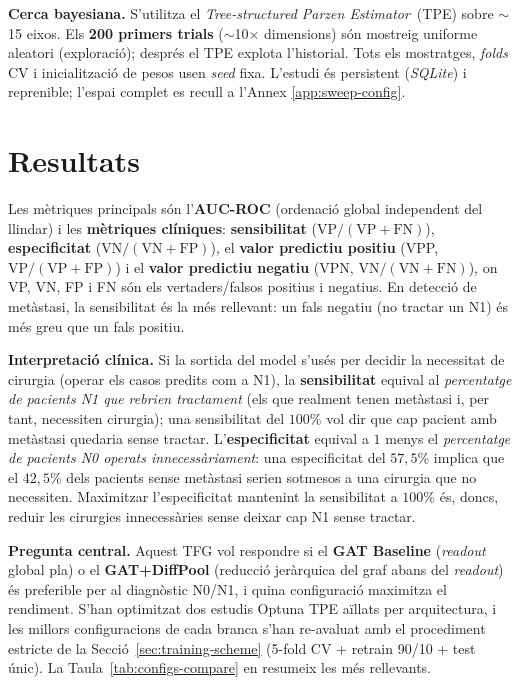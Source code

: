 \documentclass[10pt,a4paper,twocolumn,twoside]{article}
\begin{document}
\textbf{Cerca bayesiana.} S'utilitza el \textit{Tree-structured Parzen Estimator}~(TPE) sobre
$\sim$15 eixos. Els \textbf{200 primers trials} ($\sim$10$\times$ dimensions) són mostreig uniforme
aleatori (exploració); després el TPE explota l'historial. Tots els mostratges, \textit{folds} CV i
inicialització de pesos usen \textit{seed} fixa. L'estudi és persistent (\textit{SQLite}) i reprenible;
l'espai complet es recull a l'Annex \ref{app:sweep-config}.

\section{Resultats}

Les mètriques principals són l'\textbf{AUC-ROC} (ordenació global independent del llindar)
i les \textbf{mètriques clíniques}: \textbf{sensibilitat} ($\text{VP}/(\text{VP}+\text{FN})$),
\textbf{especificitat} ($\text{VN}/(\text{VN}+\text{FP})$), el \textbf{valor predictiu positiu}
(VPP, $\text{VP}/(\text{VP}+\text{FP})$) i el \textbf{valor predictiu negatiu}
(VPN, $\text{VN}/(\text{VN}+\text{FN})$), on VP, VN, FP i FN són els vertaders/falsos
positius i negatius. En detecció de metàstasi, la
sensibilitat és la més rellevant: un fals negatiu (no tractar un N1) és més greu que un
fals positiu.

\textbf{Interpretació clínica.} Si la sortida del model s'usés per decidir la necessitat
de cirurgia (operar els casos predits com a N1), la \textbf{sensibilitat} equival al
\emph{percentatge de pacients N1 que rebrien tractament} (els que realment tenen
metàstasi i, per tant, necessiten cirurgia); una sensibilitat del $100\%$ vol dir que
cap pacient amb metàstasi quedaria sense tractar. L'\textbf{especificitat} equival a
$1$ menys el \emph{percentatge de pacients N0 operats innecessàriament}: una especificitat
del $57{,}5\%$ implica que el $42{,}5\%$ dels pacients sense metàstasi serien sotmesos a
una cirurgia que no necessiten. Maximitzar l'especificitat mantenint la sensibilitat a
$100\%$ és, doncs, reduir les cirurgies innecessàries sense deixar cap N1 sense tractar.

\textbf{Pregunta central.} Aquest TFG vol respondre si el \textbf{GAT Baseline}
(\textit{readout} global pla) o el \textbf{GAT+DiffPool} (reducció jeràrquica del graf
abans del \textit{readout}) és preferible per al diagnòstic N0/N1, i quina configuració
maximitza el rendiment. S'han optimitzat dos estudis Optuna TPE aïllats per arquitectura, i les millors
configuracions de cada branca s'han re-avaluat amb el procediment estricte de la
Secció~\ref{sec:training-scheme} (5-fold CV + retrain 90/10 + test únic). La
Taula~\ref{tab:configs-compare} en resumeix les més rellevants.
\end{document}
